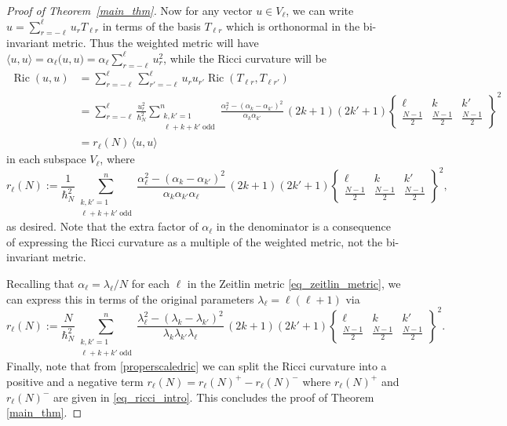 \documentclass[11pt]{amsart}
\numberwithin{equation}{section}
\theoremstyle{definition}
\DeclareMathOperator{\Ric}{Ric}
\newcommand{\weight}{\alpha}
\begin{document}
\begin{proof}[Proof of Theorem~\ref{main_thm}]
Now for any vector $u\in V_{\ell}$, we can write $u=\sum_{r=-\ell}^{\ell} u_r T_{\ell r}$ in terms of the basis $T_{\ell r}$ which is orthonormal in the bi-invariant metric. Thus the weighted metric will have $\langle u,u\rangle = \alpha_{\ell} \big( u,u\big)=\alpha_{\ell}\sum_{r=-\ell}^{\ell} u_r^2$, while the Ricci curvature will be 
\begin{align*}
\Ric(u,u) &= \sum_{r=-\ell}^{\ell} \sum_{r'=-\ell}^{\ell} u_ru_{r'}\Ric(T_{\ell r},T_{\ell r'}) \\
&= \sum_{r=-\ell}^{\ell} \frac{u_r^2}{\hbar_N^2} \sum\limits_{\substack{k, k' = 1 \\ \ell+k+k'\;\mathrm{odd}}}^n \frac{\weight_{\ell}^2 - (\weight_{k}-\weight_{k'})^2}{\weight_{k}\weight_{k'}} 
\, (2k+1)(2k'+1)  \left\{\begin{matrix}
\ell & k & k' \\
\frac{N-1}{2} & \frac{N-1}{2} & \frac{N-1}{2}
\end{matrix}
\right\}^2 \\
&= r_{\ell}(N) \,\langle u,u\rangle
\end{align*}
in each subspace $V_{\ell}$, 
where 
\begin{equation*}
    r_{\ell}(N) := \frac{1}{\hbar_N^2} \sum\limits_{\substack{k, k' = 1 \\ \ell+k+k'\;\mathrm{odd}}}^n \frac{\weight_{\ell}^2 - (\weight_{k}-\weight_{k'})^2}{\weight_{k}\weight_{k'}\weight_{\ell}} 
\, (2k+1)(2k'+1)  \left\{\begin{matrix}
\ell & k & k' \\
\frac{N-1}{2} & \frac{N-1}{2} & \frac{N-1}{2}
\end{matrix}
\right\}^2,
\end{equation*} 
as desired. Note that the extra factor of $\alpha_{\ell}$ in the denominator is a consequence of expressing the Ricci curvature as a multiple of the weighted metric, not the bi-invariant metric.


Recalling that $\alpha_{\ell} = \lambda_{\ell}/N$ for each $\ell$ in the Zeitlin metric \eqref{eq_zeitlin_metric}, we can express this in terms of the original parameters $\lambda_{\ell}=\ell(\ell+1)$ via 
\begin{equation}\label{properscaledric}
r_{\ell}(N) := \frac{N}{\hbar_N^2} \sum\limits_{\substack{k, k' = 1 \\ \ell+k+k'\;\mathrm{odd}}}^n \frac{\lambda_{\ell}^2 - (\lambda_{k}-\lambda_{k'})^2}{\lambda_{k}\lambda_{k'}\lambda_{\ell}} 
\, (2k+1)(2k'+1)  \left\{\begin{matrix}
\ell & k & k' \\
\frac{N-1}{2} & \frac{N-1}{2} & \frac{N-1}{2}
\end{matrix}
\right\}^2.
\end{equation}
Finally, note that from \eqref{properscaledric} we can split the Ricci curvature into a positive and a negative term
$r_{\ell}(N) = r_{\ell}(N)^+-r_{\ell}(N)^-$ where $r_{\ell}(N)^+$ and $r_{\ell}(N)^-$ are given in \eqref{eq_ricci_intro}. This concludes the proof of Theorem \ref{main_thm}.
\end{proof}
\end{document}
